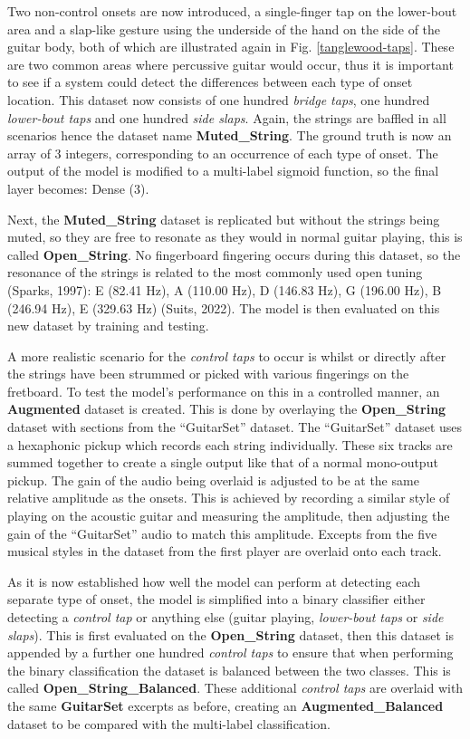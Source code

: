 \documentclass[conference]{IEEEtran}
\begin{document}
Two non-control onsets are now introduced, a single-finger tap on the lower-bout area and a slap-like gesture using the underside of the hand on the side of the guitar body, both of which are illustrated again in Fig. \ref{tanglewood-taps}. These are two common areas where percussive guitar would occur, thus
it is important to see if a system could detect the differences between each type of onset location. This dataset now consists of one hundred \emph{bridge taps}, one hundred \emph{lower-bout taps} and one hundred \emph{side slaps}. Again, the strings are baffled in all scenarios hence the dataset name \textbf{Muted\_String}.
The ground truth is now an array of 3 integers, corresponding to an occurrence of each type of onset. The output of the model is modified to a multi-label sigmoid function, so the final layer becomes: Dense (3). 

Next, the \textbf{Muted\_String} dataset is replicated but without the strings being muted, so they are free to resonate as they would in normal guitar playing, this is called \textbf{Open\_String}. No fingerboard fingering occurs during this dataset, so the resonance of the strings is related 
to the most commonly used open tuning (Sparks, 1997): E (82.41 Hz), A (110.00 Hz), D (146.83 Hz), G (196.00 Hz), B (246.94 Hz), E (329.63 Hz) (Suits, 2022). The model is then evaluated on this new dataset by training and testing.

A more realistic scenario for the \emph{control taps} to occur is whilst or directly after the strings have been strummed or picked with various fingerings on the fretboard. To test the model's performance on this in a controlled manner, an \textbf{Augmented} dataset is created. 
This is done by overlaying the \textbf{Open\_String} dataset with sections from the ``GuitarSet'' dataset. The ``GuitarSet'' dataset uses a hexaphonic pickup which records each string individually. These six tracks are summed together
to create a single output like that of a normal mono-output pickup. The gain of the audio being overlaid is adjusted to be at the same relative amplitude as the onsets. This is achieved by recording a similar style of playing on the acoustic guitar and measuring the amplitude, then adjusting
the gain of the ``GuitarSet'' audio to match this amplitude. Excepts from the five musical styles in the dataset from the first player are overlaid onto each track. 

As it is now established how well the model can perform at detecting each separate type of onset, the model is simplified into a binary classifier either detecting a \emph{control tap} or anything else (guitar playing, \emph{lower-bout taps} or \emph{side slaps}). 
This is first evaluated on the \textbf{Open\_String} dataset, then this dataset is appended by a further one hundred \emph{control taps} to ensure that when performing the binary classification the dataset is balanced between the two classes. This is called \textbf{Open\_String\_Balanced}. 
These additional \emph{control taps} are overlaid with the same \textbf{GuitarSet} excerpts as before, creating an \textbf{Augmented\_Balanced} dataset to be compared with the multi-label classification.
\end{document}
